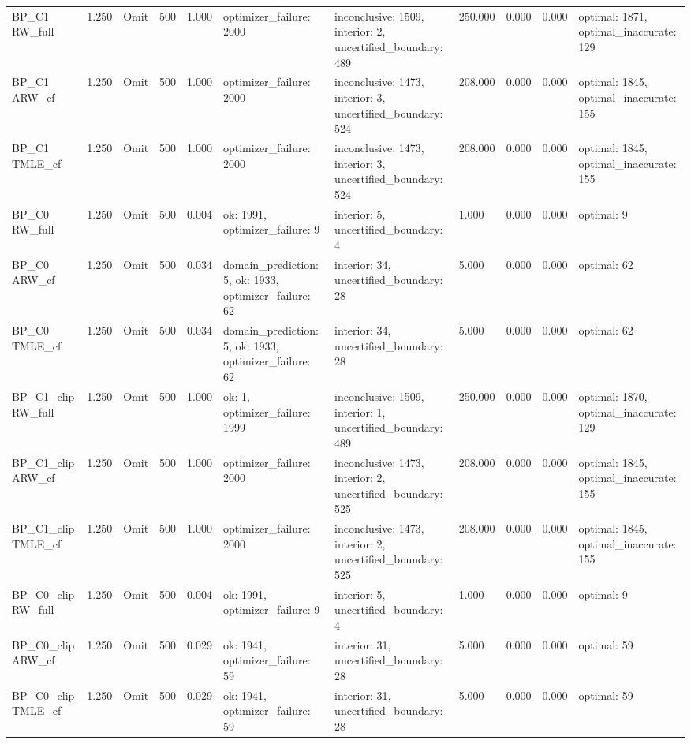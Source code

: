 \begin{tabular}{llllrlllrrl}
BP\_C1 RW\_full & 1.250 & Omit & 500 & 1.000 & optimizer\_failure: 2000 & inconclusive: 1509, interior: 2, uncertified\_boundary: 489 & 250.000 & 0.000 & 0.000 & optimal: 1871, optimal\_inaccurate: 129 \\
BP\_C1 ARW\_cf & 1.250 & Omit & 500 & 1.000 & optimizer\_failure: 2000 & inconclusive: 1473, interior: 3, uncertified\_boundary: 524 & 208.000 & 0.000 & 0.000 & optimal: 1845, optimal\_inaccurate: 155 \\
BP\_C1 TMLE\_cf & 1.250 & Omit & 500 & 1.000 & optimizer\_failure: 2000 & inconclusive: 1473, interior: 3, uncertified\_boundary: 524 & 208.000 & 0.000 & 0.000 & optimal: 1845, optimal\_inaccurate: 155 \\
BP\_C0 RW\_full & 1.250 & Omit & 500 & 0.004 & ok: 1991, optimizer\_failure: 9 & interior: 5, uncertified\_boundary: 4 & 1.000 & 0.000 & 0.000 & optimal: 9 \\
BP\_C0 ARW\_cf & 1.250 & Omit & 500 & 0.034 & domain\_prediction: 5, ok: 1933, optimizer\_failure: 62 & interior: 34, uncertified\_boundary: 28 & 5.000 & 0.000 & 0.000 & optimal: 62 \\
BP\_C0 TMLE\_cf & 1.250 & Omit & 500 & 0.034 & domain\_prediction: 5, ok: 1933, optimizer\_failure: 62 & interior: 34, uncertified\_boundary: 28 & 5.000 & 0.000 & 0.000 & optimal: 62 \\
BP\_C1\_clip RW\_full & 1.250 & Omit & 500 & 1.000 & ok: 1, optimizer\_failure: 1999 & inconclusive: 1509, interior: 1, uncertified\_boundary: 489 & 250.000 & 0.000 & 0.000 & optimal: 1870, optimal\_inaccurate: 129 \\
BP\_C1\_clip ARW\_cf & 1.250 & Omit & 500 & 1.000 & optimizer\_failure: 2000 & inconclusive: 1473, interior: 2, uncertified\_boundary: 525 & 208.000 & 0.000 & 0.000 & optimal: 1845, optimal\_inaccurate: 155 \\
BP\_C1\_clip TMLE\_cf & 1.250 & Omit & 500 & 1.000 & optimizer\_failure: 2000 & inconclusive: 1473, interior: 2, uncertified\_boundary: 525 & 208.000 & 0.000 & 0.000 & optimal: 1845, optimal\_inaccurate: 155 \\
BP\_C0\_clip RW\_full & 1.250 & Omit & 500 & 0.004 & ok: 1991, optimizer\_failure: 9 & interior: 5, uncertified\_boundary: 4 & 1.000 & 0.000 & 0.000 & optimal: 9 \\
BP\_C0\_clip ARW\_cf & 1.250 & Omit & 500 & 0.029 & ok: 1941, optimizer\_failure: 59 & interior: 31, uncertified\_boundary: 28 & 5.000 & 0.000 & 0.000 & optimal: 59 \\
BP\_C0\_clip TMLE\_cf & 1.250 & Omit & 500 & 0.029 & ok: 1941, optimizer\_failure: 59 & interior: 31, uncertified\_boundary: 28 & 5.000 & 0.000 & 0.000 & optimal: 59 \\

\end{tabular}
